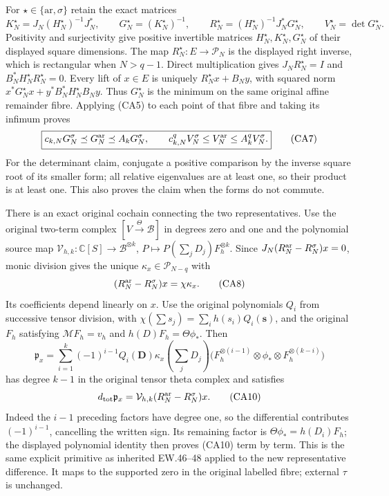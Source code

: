For $\star\in\{\mathrm{ar},\sigma\}$ retain the exact matrices
\[
 K_N^\star=J_N(H_N^\star)^{-1}J_N^*,\qquad
 G_N^\star=(K_N^\star)^{-1},\qquad
 R_N^\star=(H_N^\star)^{-1}J_N^*G_N^\star,
 \qquad V_N^\star=\det G_N^\star.
 \tag{CA6}
\]
Positivity and surjectivity give positive invertible matrices
$H_N^\star,K_N^\star,G_N^\star$ of their displayed square dimensions.
The map $R_N^\star:E\to\mathcal P_N$ is the displayed right inverse,
which is rectangular when $N>q-1$. Direct multiplication gives
$J_NR_N^\star=I$ and $B_N^*H_N^\star R_N^\star=0$.  Every lift of
$x\in E$ is uniquely $R_N^\star x+B_Ny$, with squared norm
$x^*G_N^\star x+y^*B_N^*H_N^\star B_Ny$.  Thus $G_N^\star$ is
the minimum on the same original affine remainder fibre.
Applying (CA5) to each point of that fibre and taking its infimum proves
\[
 \boxed{c_{k,N}G_N^\sigma\preceq G_N^{\rm ar}
          \preceq A_kG_N^\sigma,\qquad
 c_{k,N}^{q}V_N^\sigma\le V_N^{\rm ar}\le A_k^qV_N^\sigma.}
 \tag{CA7}
\]
For the determinant claim, conjugate a positive comparison by the
inverse square root of its smaller form; all relative eigenvalues are
at least one, so their product is at least one.  This also proves the
claim when the forms do not commute.

There is an exact original cochain connecting the two representatives.
Use the original two-term complex $[V\xrightarrow{\Theta}\mathscr B]$
in degrees zero and one and the polynomial source map
$\mathcal V_{h,k}:\mathbb C[S]\to\mathscr B^{\otimes k}$,
$P\mapsto P(\sum_jD_j)F_h^{\otimes k}$.
Since $J_N(R_N^{\rm ar}-R_N^\sigma)x=0$, monic division gives the
unique $\kappa_x\in\mathcal P_{N-q}$ with
\[
 (R_N^{\rm ar}-R_N^\sigma)x=\chi\kappa_x.
 \tag{CA8}
\]
Its coefficients depend linearly on $x$.  Use the original polynomials
$Q_i$ from successive tensor division, with
$\chi(\sum s_j)=\sum_i h(s_i)Q_i(\mathbf s)$, and the original
$F_h$ satisfying $\mathcal MF_h=v_h$ and $h(D)F_h=\Theta\phi_*$. Then
\[
 \mathfrak p_x=\sum_{i=1}^k(-1)^{i-1}Q_i(\mathbf D)
 \kappa_x(\textstyle\sum_jD_j)
 \bigl(F_h^{\otimes(i-1)}\otimes\phi_*\otimes
 F_h^{\otimes(k-i)}\bigr)
 \tag{CA9}
\]
has degree $k-1$ in the original tensor theta complex and satisfies
\[
 d_{\rm tot}\mathfrak p_x=
 \mathcal V_{h,k}(R_N^{\rm ar}-R_N^\sigma)x.
 \tag{CA10}
\]
Indeed the $i-1$ preceding factors have degree one, so the differential
contributes $(-1)^{i-1}$, cancelling the written sign.  Its remaining
factor is $\Theta\phi_*=h(D_i)F_h$; the displayed polynomial identity
then proves (CA10) term by term.  This is the same explicit primitive
as inherited EW.46--48 applied to the new representative difference.
It maps to the supported zero in the original labelled fibre; external
$\tau$ is unchanged.

